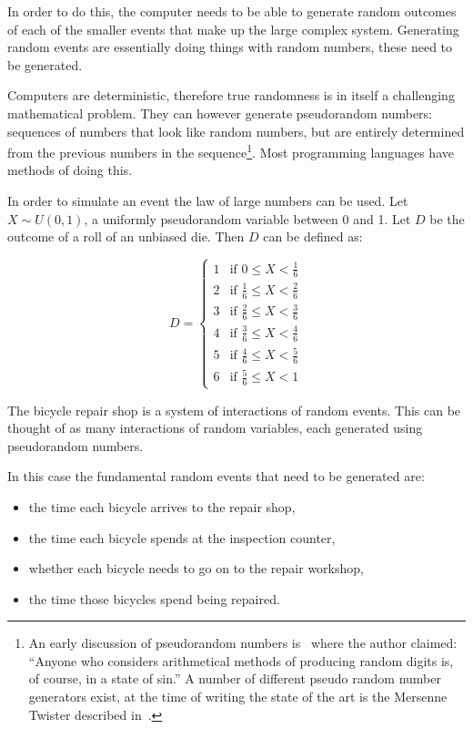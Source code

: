 In order to do this, the computer needs to be able to generate random outcomes
of each of the smaller events that make up the large complex system. Generating
random events are essentially doing things with random numbers, these need to be
generated.

Computers are deterministic, therefore true randomness is in itself a
challenging mathematical problem.
They can however generate pseudorandom numbers: sequences of numbers that look
like random numbers, but are entirely determined from the
previous numbers in the sequence\footnote{An early
discussion of pseudorandom numbers is~\cite{von195113} where the author
claimed: ``Anyone who considers arithmetical methods of producing random digits %
is, of course, in a state of sin.'' A number of different pseudo random
number generators exist, at the time of writing the state of the art is the
Mersenne Twister described in~\cite{matsumoto1998mersenne}. }.
Most programming languages have methods of
doing this.

In order to simulate an event the law of large numbers can be used.
Let \(X \sim U(0, 1)\), a uniformly pseudorandom variable between 0 and 1.
Let \(D\) be the outcome of a roll of an unbiased die. Then \(D\) can be defined as:

\begin{equation}
D =
  \begin{cases}
    1 & \text{if } 0 \leq X < \frac{1}{6}\\
    2 & \text{if } \frac{1}{6} \leq X < \frac{2}{6}\\
    3 & \text{if } \frac{2}{6} \leq X < \frac{3}{6}\\
    4 & \text{if } \frac{3}{6} \leq X < \frac{4}{6}\\
    5 & \text{if } \frac{4}{6} \leq X < \frac{5}{6}\\
    6 & \text{if } \frac{5}{6} \leq X < 1
  \end{cases}
\end{equation}

The bicycle repair shop is a system of interactions of
random events. This can be thought of as many interactions of random
variables, each generated using pseudorandom numbers.

In this case the fundamental random events that need to be generated are:

\begin{itemize}
  \item the time each bicycle arrives to the repair shop,
  \item the time each bicycle spends at the inspection counter,
  \item whether each bicycle needs to go on to the repair workshop,
  \item the time those bicycles spend being repaired.
\end{itemize}

